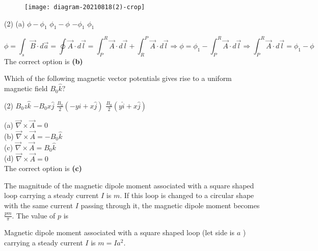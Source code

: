 \begin{enumerate}
\begin{minipage}{\textwidth}
		\begin{figure}[H]
			\centering
			\texttt{[image: diagram-20210818(2)-crop]}
		\end{figure}
	\end{minipage}
	\begin{tasks}(2)
		\task[\textbf{A.}](a) $\phi-\phi_{1}$
		\task[\textbf{B.}] $\phi_{1}-\phi$
		\task[\textbf{C.}]$-\phi_{1}$
		\task[\textbf{D.}] $\phi_{1}$
	\end{tasks}
	\begin{answer}
		$$\phi=\int_{s} \vec{B} \cdot d \vec{a}=\oint \vec{A} \cdot d \vec{l}=\int_{P}^{R} \vec{A} \cdot d \vec{l}+\int_{R}^{P} \vec{A} \cdot d \vec{l} \Rightarrow \phi=\phi_{1}-\int_{P}^{R} \vec{A} \cdot d \vec{l} \Rightarrow \int_{P}^{R} \vec{A} \cdot d \vec{l}=\phi_{1}-\phi$$
		The correct option is \textbf{(b)}	
	\end{answer}
	\begin{minipage}{\textwidth}
		\item Which of the following magnetic vector potentials gives rise to a uniform magnetic field $B_{0} \hat{k} ?$
	\end{minipage}
	\begin{tasks}(2)
		\task[\textbf{A.}] $B_{0} z \hat{k}$
		\task[\textbf{B.}]$-B_{0} x \hat{j}$
		\task[\textbf{C.}]$\frac{B_{0}}{2}(-y \hat{i}+x \hat{j})$
		\task[\textbf{D.}]$\frac{B_{0}}{2}(y \hat{i}+x \hat{j})$
	\end{tasks}
	\begin{answer}
		(a) $\vec{\nabla} \times \vec{A}=0$\\
		(b) $\vec{\nabla} \times \vec{A}=-B_{0} \hat{k}$\\
		(c) $\vec{\nabla} \times \vec{A}=B_{0} \hat{k}$\\
		(d) $\vec{\nabla} \times \vec{A}=0$\\
		The correct option is \textbf{(c)}
	\end{answer}
	\begin{minipage}{\textwidth}
		\item The magnitude of the magnetic dipole moment associated with a square shaped loop carrying a steady current $I$ is $m$. If this loop is changed to a circular shape with the same current $I$ passing through it, the magnetic dipole moment becomes $\frac{p m}{\pi} .$ The value of $p$ is
	\end{minipage}
	\begin{answer}
		Magnetic dipole moment associated with a square shaped loop (let side is $a$ ) carrying a steady current $I$ is $m=I a^{2}$.
		

\end{answer}
\end{enumerate}
